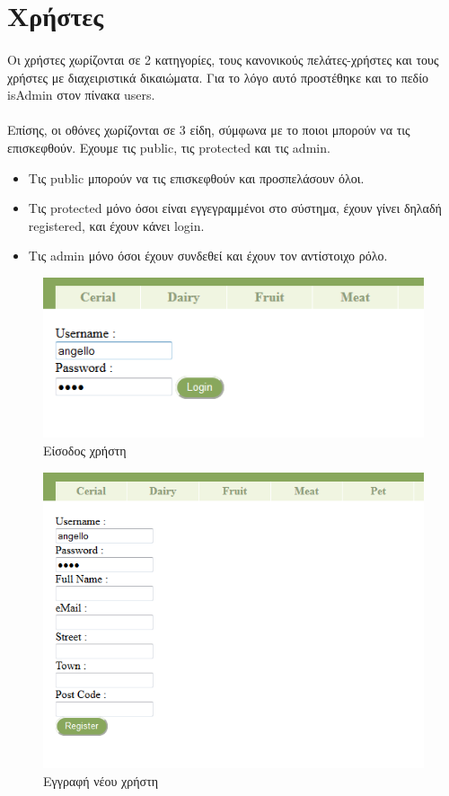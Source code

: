 \documentclass[12pt]{article}
\begin{document}
	\section{Χρήστες}
	  \paragraph{}
		Οι χρήστες χωρίζονται σε 2 κατηγορίες, τους κανονικούς πελάτες-χρήστες και τους χρήστες με διαχειριστικά δικαιώματα. Για το λόγο αυτό προστέθηκε και το πεδίο isAdmin στον πίνακα users.
	  \paragraph{}
		Επίσης, οι οθόνες χωρίζονται σε 3 είδη, σύμφωνα με το ποιοι μπορούν να τις επισκεφθούν. Εχουμε τις public, τις protected και τις admin.
		\begin{itemize}
	  	  \item Τις public μπορούν να τις επισκεφθούν και προσπελάσουν όλοι.
	  	  \item Τις protected μόνο όσοι είναι εγγεγραμμένοι στο σύστημα, έχουν γίνει δηλαδή registered, και έχουν κάνει login.
	  	  \item Τις admin μόνο όσοι έχουν συνδεθεί και έχουν τον αντίστοιχο ρόλο.
		\end{itemize}
	
		\begin{figure}[H]
			\centering
			\includegraphics[width=1\textwidth]{login}
			\caption{Είσοδος χρήστη}
		\end{figure}
		\begin{figure}[H]
			\centering
			\includegraphics[width=1\textwidth]{register}
			\caption{Εγγραφή νέου χρήστη}
		\end{figure}
\end{document}

